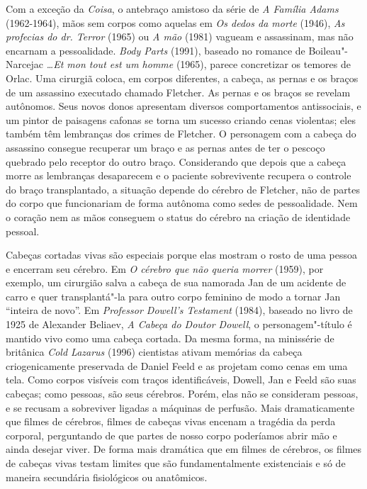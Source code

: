 Com a exceção da \emph{Coisa}, o antebraço amistoso da série de 
\emph{A Família Adams} (1962-1964), mãos sem corpos como aquelas em
\emph{Os dedos da morte} (1946), \emph{As profecias do dr. Terror}
(1965) ou \emph{A mão} (1981) vagueam e assassinam, mas não encarnam a
pessoalidade. \emph{Body Parts} (1991), baseado no romance de
Boileau"-Narcejac \emph{\ldots{}Et mon tout est um homme} (1965), parece
concretizar os temores de Orlac. Uma cirurgiã coloca, em corpos
diferentes, a cabeça, as pernas e os braços de um assassino executado
chamado Fletcher. As pernas e os braços se revelam autônomos. Seus novos
donos apresentam diversos comportamentos antissociais, e um pintor de
paisagens cafonas se torna um sucesso criando cenas violentas; eles
também têm lembranças dos crimes de Fletcher. O personagem com a cabeça
do assassino consegue recuperar um braço e as pernas antes de ter o
pescoço quebrado pelo receptor do outro braço. Considerando que depois
que a cabeça morre as lembranças desaparecem e o paciente sobrevivente
recupera o controle do braço transplantado, a situação depende do
cérebro de Fletcher, não de partes do corpo que funcionariam de forma
autônoma como sedes de pessoalidade. Nem o coração nem as mãos conseguem
o status do cérebro na criação de identidade pessoal.

Cabeças cortadas vivas são especiais porque elas mostram o rosto de uma
pessoa e encerram seu cérebro. Em \emph{O cérebro que não queria morrer}
(1959), por exemplo, um cirurgião salva a cabeça de sua namorada Jan de
um acidente de carro e quer transplantá"-la para outro corpo feminino de
modo a tornar Jan ``inteira de novo''. Em \emph{Professor Dowell's
Testament} (1984), baseado no livro de 1925 de Alexander Beliaev, \emph{A
Cabeça do Doutor Dowell}, o personagem"-título é mantido vivo como uma
cabeça cortada. Da mesma forma, na minissérie de  britânica \emph{Cold
Lazarus} (1996) cientistas ativam memórias da cabeça criogenicamente
preservada de Daniel Feeld e as projetam como cenas em uma tela. Como
corpos visíveis com traços identificáveis, Dowell, Jan e Feeld são suas
cabeças; como pessoas, são seus cérebros. Porém, elas não se consideram
pessoas, e se recusam a sobreviver ligadas a máquinas de perfusão. Mais
dramaticamente que filmes de cérebros, filmes de cabeças vivas encenam a
tragédia da perda corporal, perguntando de que partes de nosso corpo
poderíamos abrir mão e ainda desejar viver. De forma mais dramática que
em filmes de cérebros, os filmes de cabeças vivas testam limites que são
fundamentalmente existenciais e só de maneira secundária fisiológicos ou
anatômicos.

